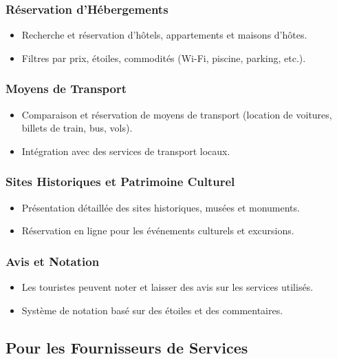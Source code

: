 \documentclass[12pt]{article}
\begin{document}
\subsubsection{Réservation d’Hébergements}
\begin{itemize}
    \item Recherche et réservation d’hôtels, appartements et maisons d’hôtes.
    \item Filtres par prix, étoiles, commodités (Wi-Fi, piscine, parking, etc.).
\end{itemize}

\subsubsection{Moyens de Transport}
\begin{itemize}
    \item Comparaison et réservation de moyens de transport (location de voitures, billets de train, bus, vols).
    \item Intégration avec des services de transport locaux.
\end{itemize}

\subsubsection{Sites Historiques et Patrimoine Culturel}
\begin{itemize}
    \item Présentation détaillée des sites historiques, musées et monuments.
    \item Réservation en ligne pour les événements culturels et excursions.
\end{itemize}

\subsubsection{Avis et Notation}
\begin{itemize}
    \item Les touristes peuvent noter et laisser des avis sur les services utilisés.
    \item Système de notation basé sur des étoiles et des commentaires.
\end{itemize}

\subsection{Pour les Fournisseurs de Services}
\end{document}
